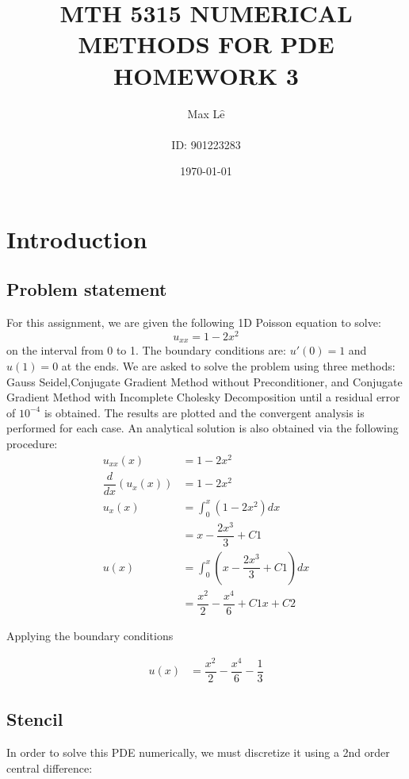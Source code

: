 \documentclass{article}
\title{MTH 5315 NUMERICAL METHODS FOR PDE \\ HOMEWORK 3}
\date{\today}
\author{\Huge Max L$\hat{\textrm{e}}$ \\ \\ ID: 901223283}
\begin{document}
\maketitle
\newpage
\tableofcontents
\newpage
\listoffigures
\newpage

\section{Introduction}
\subsection{Problem statement}
For this assignment, we are given the following 1D Poisson equation to solve: 
\\

\begin{equation}
u_{xx} = 1-2x^2
\end{equation}
\noindent
on the interval from 0 to 1. The boundary conditions are: $u'(0) = 1$ and $u(1) = 0$ at the ends. We are asked to solve the problem using three methods: Gauss Seidel,Conjugate Gradient Method without Preconditioner, and Conjugate Gradient Method with Incomplete Cholesky Decomposition until a residual error of $10^{-4}$ is obtained. The results are plotted and the convergent analysis is performed for each case. An analytical solution is also obtained via the following procedure: \\

\begin{align*}
u_{xx}(x) &= 1-2x^2 \\
\dfrac{d}{dx}(u_x(x))&= 1-2x^2\\
u_x(x)&= \int_{0}^{x} (1-2x^2) dx\\
&=x-\dfrac{2x^3}{3}+C1\\
u(x) &= \int_{0}^{x} (x-\dfrac{2x^3}{3}+C1) dx\\
&=\dfrac{x^2}{2} - \dfrac{x^4}{6} + C1x + C2
\end{align*}

\textrm{Applying the boundary conditions}

\begin{align*}
u(x) &=  \dfrac{x^2}{2} - \dfrac{x^4}{6} - \dfrac{1}{3}
\end{align*}
\subsection{Stencil}
In order to solve this PDE numerically, we must discretize it using a 2nd order central difference: 
\end{document}
